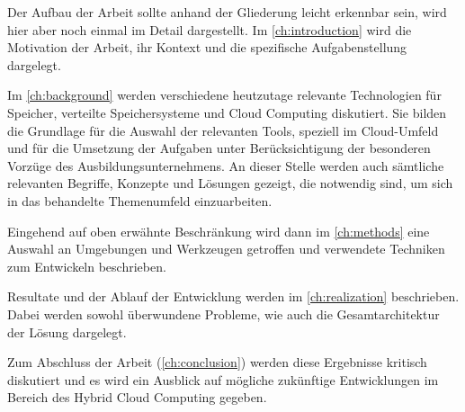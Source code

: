Der Aufbau der Arbeit sollte anhand der Gliederung leicht erkennbar sein, wird hier aber noch einmal im Detail dargestellt. Im \autoref{ch:introduction} wird die Motivation der Arbeit, ihr Kontext und die spezifische Aufgabenstellung dargelegt.

Im \autoref{ch:background} werden verschiedene heutzutage relevante Technologien für Speicher, verteilte Speichersysteme und Cloud Computing diskutiert. Sie bilden die Grundlage für die Auswahl der relevanten Tools, speziell im Cloud-Umfeld und für die Umsetzung der Aufgaben unter Berücksichtigung der besonderen Vorzüge des Ausbildungsunternehmens.
An dieser Stelle werden auch sämtliche relevanten Begriffe, Konzepte und Lösungen gezeigt, die notwendig sind, um sich in das behandelte Themenumfeld einzuarbeiten.

Eingehend auf oben erwähnte Beschränkung wird dann im \autoref{ch:methods} eine Auswahl an Umgebungen und Werkzeugen getroffen und verwendete Techniken zum Entwickeln beschrieben.

Resultate und der Ablauf der Entwicklung werden im \autoref{ch:realization} beschrieben. Dabei werden sowohl überwundene Probleme, wie auch die Gesamtarchitektur der Lösung dargelegt.

Zum Abschluss der Arbeit (\autoref{ch:conclusion}) werden diese Ergebnisse kritisch diskutiert und es wird ein Ausblick auf mögliche zukünftige Entwicklungen im Bereich des Hybrid Cloud Computing gegeben.